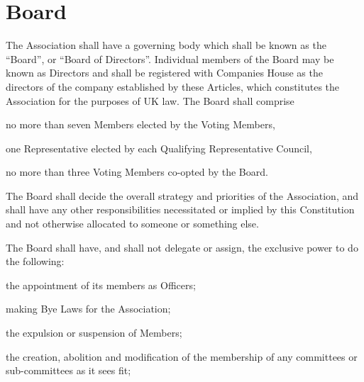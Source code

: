 \documentclass[10pt]{mk-articles-of-association}
\newcommand{\EC}[0]{Board}
\newcommand{\Exec}[0]{\EC{} }
\begin{document}

\section{\Exec}
  \begin{constenum}

  \item The Association shall have a governing body which shall be
    known as the ``\EC{}'', or ``Board of Directors''. Individual
    members of the \Exec may be known as Directors and shall be
    registered with Companies House as the directors of the company
    established by these Articles, which constitutes the Association
    for the purposes of UK law. The \Exec shall comprise
    \begin{constenum}
      \item no more than seven Members elected by the Voting
        Members, \label{ordinaryboard}
      \item one Representative elected by each Qualifying
        Representative Council, \ITand \label{boardreps}
      \item no more than three Voting Members co-opted by the
        \EC{}. \label{cooptedboard}
    \end{constenum}

  \item The \Exec shall decide the overall strategy and priorities of
    the Association, and shall have any other responsibilities
    necessitated or implied by this Constitution and not otherwise
    allocated to someone or something else.

  \item The \Exec shall have, and
    shall not delegate or assign, the exclusive power to do the
    following:\label{nondelegation}

    \begin{constenum}
      \item the appointment of its members as Officers;

      \item making Bye Laws for the Association;

      \item the expulsion or suspension of Members;

      \item the creation, abolition and modification of the membership of
        any committees or sub-committees as it sees fit;


\end{constenum}
\end{constenum}
\end{document}
